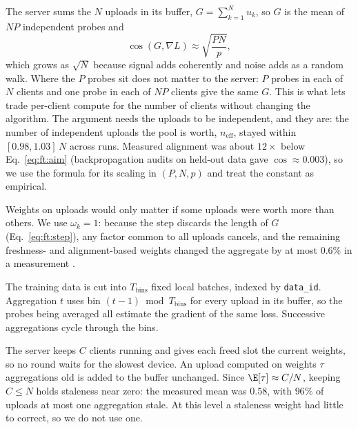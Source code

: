 The server sums the $N$ uploads in its buffer, $G=\sum_{k=1}^{N}u_k$, so $G$
is the mean of $NP$ independent probes and
\begin{equation}
\cos(G,\nabla L)\approx\sqrt{\frac{PN}{p}} ,
\label{eq:ft:aim}
\end{equation}
which grows as $\sqrt N$ because signal adds coherently and noise adds as a
random walk. Where the $P$ probes sit does not matter to the server: $P$ probes
in each of $N$ clients and one probe in each of $NP$ clients give the same
$G$. This is what lets \sys trade per-client compute for the number of
clients without changing the algorithm. The argument needs the uploads to be
independent, and they are: the number of independent uploads the pool is
worth, $n_{\mathrm{eff}}$, stayed within $[0.98,1.03]\,N$ across runs. Measured
alignment was about $12\times$ below Eq.~\eqref{eq:ft:aim} (backpropagation
audits on held-out data gave $\cos\approx0.003$), so we use the formula for
its scaling in $(P,N,p)$ and treat the constant as empirical.

Weights on uploads would only matter if some uploads were worth more than
others. We use $\omega_k=1$: because the step discards the length of $G$
(Eq.~\eqref{eq:ft:step}), any factor common to all uploads cancels, and the
remaining freshness- and alignment-based weights changed the aggregate by at
most $0.6\%$ in a measurement .

The training data is cut into $T_{\mathrm{bins}}$ fixed local batches, indexed
by \texttt{data\_id}. Aggregation $t$ uses bin $(t-1)\bmod T_{\mathrm{bins}}$
for every upload in its buffer, so the probes being averaged all estimate the
gradient of the same loss. Successive aggregations cycle through the bins.

The server keeps $C$ clients running and gives each freed slot the current
weights, so no round waits for the slowest device. An upload computed on
weights $\tau$ aggregations old is added to the buffer unchanged. Since
$\E[\tau]\approx C/N$, keeping $C\le N$ holds staleness near zero: the measured
mean was $0.58$, with $96\%$ of uploads at most one aggregation stale. At this
level a staleness weight had little to correct, so we do not use one.

